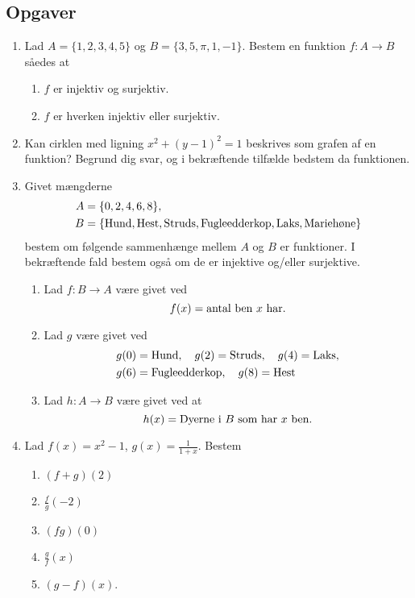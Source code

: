 \subsection{Opgaver}

\begin{enumerate}
	\item  Lad $A=\{1,2,3,4,5\}$ og $ B=\{ 3,5,\pi , 1,-1 \} $. Bestem en funktion $f\colon A\to B$ såedes at
	\begin{enumerate}
		\item $ f $ er injektiv og surjektiv.
		\item $f$ er hverken injektiv eller surjektiv.
	\end{enumerate}
	
	
	\item Kan cirklen med ligning $x^{2} +(y-1)^{2}=1$ beskrives som grafen af en funktion? Begrund dig svar, og i bekræftende tilfælde bedstem da funktionen.
	
	\item Givet mængderne 
	\begin{align*}
	A&= \{0,2,4,6,8\},\\
	B&=\{\text{Hund},\textup{Hest},\textup{Struds},\textup{Fugleedderkop},\textup{Laks},\textup{Mariehøne} \}
	\end{align*}
	bestem om følgende sammenhænge mellem $A$ og $B$ er funktioner. I bekræftende fald bestem også om de er injektive og/eller surjektive.
	\begin{enumerate}
		\item Lad $f\colon B\to A$ være givet ved
		\[f(x)=\textup{antal ben }x \textup{ har}.\]
		\item Lad $g$ være givet ved
		\begin{align*}
		g(0)&=\textup{Hund},\quad g(2)=\textup{Struds},\quad g(4)=\textup{Laks},\\ g(6)&=\textup{Fugleedderkop},\quad g(8)=\textup{Hest}
		\end{align*}
		
		\item Lad $ h\colon A\to B$ være givet ved at 
		\[h(x)= \textup{Dyerne i }B \textup{ som har } x \textup{ ben}.\] 
	\end{enumerate}

	\item Lad $f(x)=x^2-1$, $g(x)=\frac{1}{1+x}$. Bestem
	\begin{enumerate}
		\item $(f+g)(2)$
		\item $ \frac{f}{g}(-2) $
		\item $(fg)(0)$
		\item $\frac{g}{f}(x)$
		\item $(g-f)(x)$.
	\end{enumerate}


\end{enumerate}
